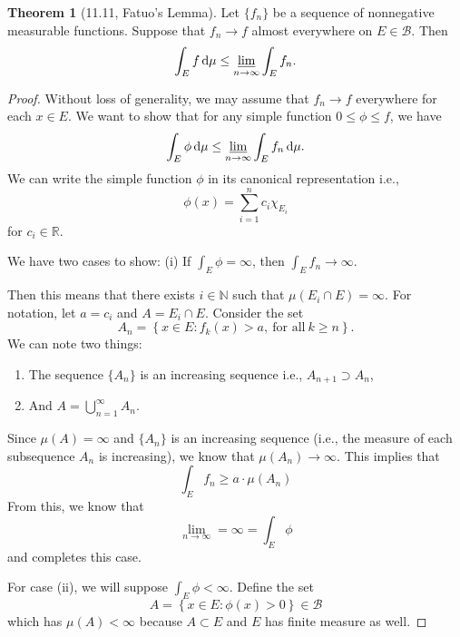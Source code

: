 \documentclass[12pt]{article}
\newcommand{\R}{\mathbb{R}}
\newcommand{\N}{\mathbb{N}}
\newcommand{\B}{\mathcal{B}}
\newcommand{\dif}{\, \mathrm{d}}
\theoremstyle{definition}
\newtheorem*{thm}{Theorem}
\begin{document}
\begin{thm}[11.11, Fatuo's Lemma]

    Let \( \{f_n\} \) be a sequence of nonnegative measurable functions. 
    Suppose that \( f_n \to f \) almost everywhere on \( E \in \B \).
    Then 
      \[
          \int_{E} f \dif \mu \leq \varliminf_{n \to \infty} \int_{E} f_n.
      \]
        \begin{proof}
          Without loss of generality, we may assume that \( f_n \to f \) everywhere for each \( x \in E \). 
          We want to show that for any simple function \( 0 \leq \phi \leq f \), we have 
            \[
                \int_{E} \phi \dif \mu \leq \varliminf_{n \to \infty} \int_{E} f_n \dif \mu.
            \] 
          We can write the simple function \( \phi \) in its canonical representation i.e.,
            \[
                \phi(x) = \sum_{i=1}^{n} c_i \chi_{E_{i}}
            \]
          for \( c_i \in \R \).

          We have two cases to show: (i) If \( \displaystyle \int_{E} \phi = \infty \), then \( \displaystyle \int_{E} f_n \to \infty \).

          Then this means that there exists \( i \in \N \) such that \( \mu \left( E_i \cap E\right) = \infty \). 
          For notation, let \( a = c_i \) and \( A = E_i \cap E \).
          Consider the set 
            \[
              A_n = \left\{ x \in E : f_k(x) > a, \ \text{for all} \ k \geq n\right\}.  
            \]
          We can note two things:
            \begin{enumerate}[label = (\arabic{*})]
              \item The sequence \( \{A_n\} \) is an increasing sequence i.e., \( A_{n+1} \supset A_{n} \),
              \item And \( \displaystyle A = \bigcup_{n=1}^{\infty} A_n \).
            \end{enumerate}
          Since \( \mu(A) = \infty \) and \( \{A_n\} \) is an increasing sequence (i.e., the measure of each subsequence \(A_n\) is increasing), we know that \( \mu(A_n) \to \infty \).
          This implies that 
            \[  
                \int_{E} f_n \geq a \cdot \mu(A_n)
            \]
          From this, we know that 
            \[
                \lim_{n \to \infty} = \infty = \int_{E} \phi
            \]
          and completes this case.

          For case (ii), we will suppose \( \displaystyle \int_{E} \phi < \infty \). Define the set 
            \[  
                A = \left\{ x \in E: \phi(x) > 0 \right\} \in \B 
            \]
          which has \( \mu(A) < \infty \) because \( A \subset E \) and \( E \) has finite measure as well. 


\end{proof}
\end{thm}
\end{document}

